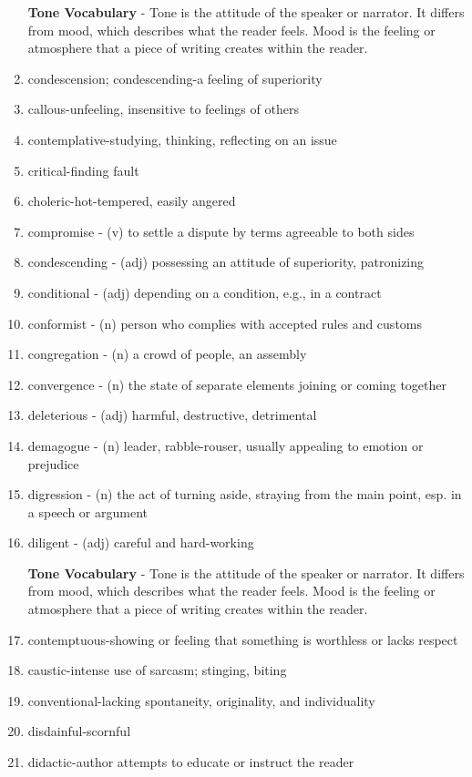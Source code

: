 \begin{enumerate}
\bigskip
\textbf{Tone Vocabulary} - Tone is the attitude of the speaker or narrator.  It differs from mood, which describes what the reader feels.  Mood is the feeling or atmosphere that a piece of writing creates within the reader.  

\item condescension; condescending-a feeling of superiority
\item callous-unfeeling, insensitive to feelings of others
\item contemplative-studying, thinking, reflecting on an issue
\item critical-finding fault
\item choleric-hot-tempered, easily angered 

\bigskip
\item compromise - (v) to settle a dispute by terms agreeable to both sides
\item condescending - (adj) possessing an attitude of superiority, patronizing
\item conditional - (adj) depending on a condition, e.g., in a contract
\item conformist - (n) person who complies with accepted rules and customs
\item congregation - (n) a crowd of people, an assembly
\item convergence - (n) the state of separate elements joining or coming together
\item deleterious - (adj) harmful, destructive, detrimental
\item demagogue - (n) leader, rabble-rouser, usually appealing to emotion or prejudice
\item digression - (n) the act of turning aside, straying from the main point, esp. in a speech or argument
\item diligent - (adj) careful and hard-working

\bigskip
\textbf{Tone Vocabulary} - Tone is the attitude of the speaker or narrator.  It differs from mood, which describes what the reader feels.  Mood is the feeling or atmosphere that a piece of writing creates within the reader.  


\item contemptuous-showing or feeling that something is worthless or lacks respect
\item caustic-intense use of sarcasm; stinging, biting
\item conventional-lacking spontaneity, originality, and individuality
\item disdainful-scornful
\item didactic-author attempts to educate or instruct the reader 


\end{enumerate}
